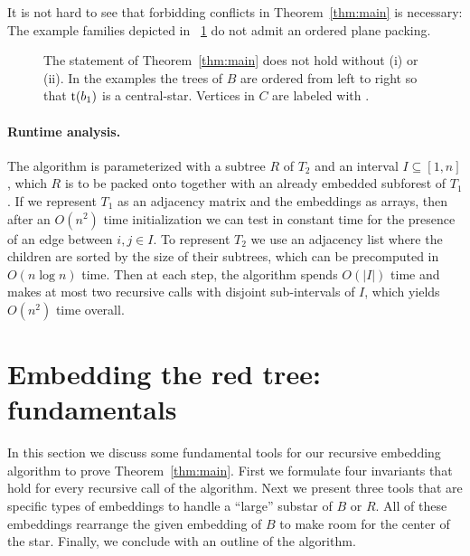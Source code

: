 \documentclass[11pt,a4paper,colorlinks=true,urlcolor=blue,citecolor=red]{article}
\theoremstyle{plain}
\begin{document}
It is not hard to see that forbidding conflicts in
Theorem~\ref{thm:main} is necessary: The example families depicted in
\figurename~\ref{fig:confness} do not admit an ordered plane packing.
\begin{figure}[htbp]
  \centering {}\hfil {}\hfil \caption{The statement of Theorem~\ref{thm:main} does not hold without
    (i) or (ii). In the examples the trees of $B$ are ordered from left
    to right so that $\mathrm t(b_1)$ is a central-star. Vertices in $C$ are
    labeled with \Lightning.\label{fig:confness}}
\end{figure}


\paragraph{Runtime analysis.} The algorithm is parameterized with a
subtree $R$ of $T_2$ and an interval $I\subseteq[1,n]$, which $R$ is to
be packed onto together with an already embedded subforest of $T_1$. If
we represent $T_1$ as an adjacency matrix and the embeddings as arrays,
then after an $O(n^2)$ time initialization we can test in constant time
for the presence of an edge between $i,j\in I$. To represent $T_2$ we
use an adjacency list where the children are sorted by the size of their
subtrees, which can be precomputed in $O(n\log n)$ time. Then at each
step, the algorithm spends $O(|I|)$ time and makes at most two recursive
calls with disjoint sub-intervals of $I$, which yields $O(n^2)$ time
overall.

\section{Embedding the red tree: fundamentals}\label{sec:embedding_the_red_tree}

In this section we discuss some fundamental tools for our recursive
embedding algorithm to prove Theorem~\ref{thm:main}. First we formulate
four invariants that hold for every recursive call of the
algorithm. Next we present three tools that are specific types of
embeddings to handle a ``large'' substar of $B$ or $R$. All of these
embeddings rearrange the given embedding of $B$ to make room for the
center of the star. Finally, we conclude with an outline of the
algorithm.
\end{document}
